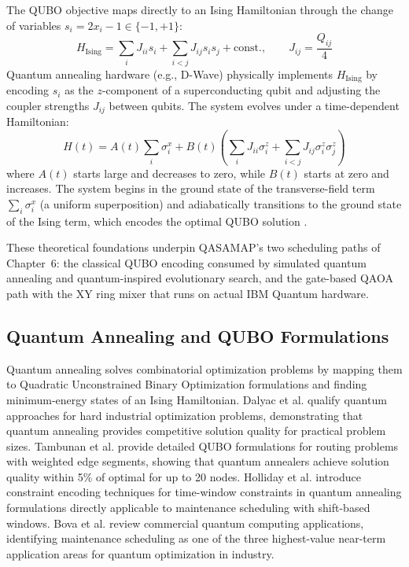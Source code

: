 The QUBO objective maps directly to an Ising Hamiltonian through the change of variables $s_i = 2x_i - 1 \in \{-1,+1\}$:
\begin{equation}
    H_{\text{Ising}} = \sum_{i} J_{ii} s_i + \sum_{i < j} J_{ij} s_i s_j + \text{const.}, \qquad J_{ij} = \frac{Q_{ij}}{4}
    \label{eq:ising}
\end{equation}
Quantum annealing hardware (e.g., D-Wave) physically implements $H_{\text{Ising}}$ by encoding $s_i$ as the $z$-component of a superconducting qubit and adjusting the coupler strengths $J_{ij}$ between qubits. The system evolves under a time-dependent Hamiltonian:
\begin{equation}
    H(t) = A(t) \sum_i \sigma_i^x + B(t) \left( \sum_i J_{ii} \sigma_i^z + \sum_{i < j} J_{ij} \sigma_i^z \sigma_j^z \right)
    \label{eq:annealing_hamiltonian}
\end{equation}
where $A(t)$ starts large and decreases to zero, while $B(t)$ starts at zero and increases. The system begins in the ground state of the transverse-field term $\sum_i \sigma_i^x$ (a uniform superposition) and adiabatically transitions to the ground state of the Ising term, which encodes the optimal QUBO solution \cite{Preskill2018}.

These theoretical foundations underpin QASAMAP's two scheduling paths of Chapter~6: the classical QUBO encoding consumed by simulated quantum annealing and quantum-inspired evolutionary search, and the gate-based QAOA path with the XY ring mixer that runs on actual IBM Quantum hardware.

\subsection{Quantum Annealing and QUBO Formulations}
Quantum annealing solves combinatorial optimization problems by mapping them to Quadratic Unconstrained Binary Optimization formulations and finding minimum-energy states of an Ising Hamiltonian. Dalyac et al. \cite{dalyac_qualifying_2021} qualify quantum approaches for hard industrial optimization problems, demonstrating that quantum annealing provides competitive solution quality for practical problem sizes. Tambunan et al. \cite{Tambunan2022} provide detailed QUBO formulations for routing problems with weighted edge segments, showing that quantum annealers achieve solution quality within 5\% of optimal for up to 20 nodes. Holliday et al. \cite{holliday_advanced_2025} introduce constraint encoding techniques for time-window constraints in quantum annealing formulations directly applicable to maintenance scheduling with shift-based windows. Bova et al. \cite{Bova2021} review commercial quantum computing applications, identifying maintenance scheduling as one of the three highest-value near-term application areas for quantum optimization in industry.

